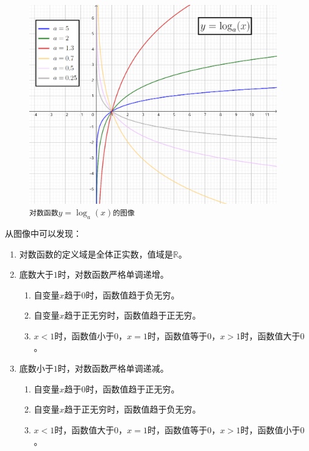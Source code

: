 \documentclass[12pt,UTF8]{ctexbook}
\begin{document}
\begin{figure}[h]
    \vspace{4pt}
    \centering
    \includegraphics[width=0.96\textwidth]{对数函数1.png}
    \caption*{\texttt{对数函数}$y = \log_a(x)$\texttt{的图像}}
\end{figure}

从图像中可以发现：
\begin{enumerate}
    \item 对数函数的定义域是全体正实数，值域是$\mathbb{R}$。
    \item 底数大于$1$时，对数函数严格单调递增。
    \begin{enumerate}[label*=\arabic*.]
        \item 自变量$x$趋于$0$时，函数值趋于负无穷。
        \item 自变量$x$趋于正无穷时，函数值趋于正无穷。
        \item $x < 1$时，函数值小于$0$，$x = 1$时，函数值等于$0$，$x > 1$时，函数值大于$0$。
    \end{enumerate}
    \item 底数小于$1$时，对数函数严格单调递减。    
    \begin{enumerate}[label*=\arabic*.]
        \item 自变量$x$趋于$0$时，函数值趋于正无穷。
        \item 自变量$x$趋于正无穷时，函数值趋于负无穷。
        \item $x < 1$时，函数值大于$0$，$x = 1$时，函数值等于$0$，$x > 1$时，函数值小于$0$。
    \end{enumerate}
\end{enumerate}
\end{document}
